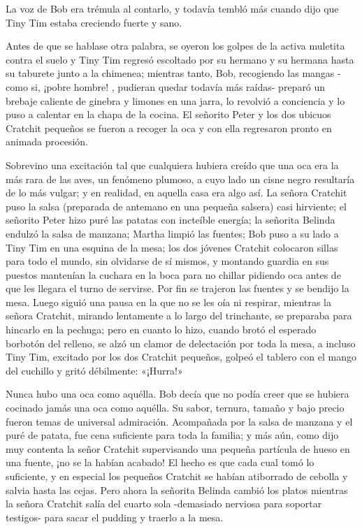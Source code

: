 \documentclass{novela}
\begin{document}
 La voz de Bob era trémula al contarlo, y todavía tembló más cuando dijo que Tiny Tim estaba creciendo fuerte y sano.

 Antes de que se hablase otra palabra, se oyeron los golpes de la activa muletita contra el suelo y Tiny Tim regresó escoltado por su hermano y su hermana hasta su taburete junto a la chimenea; mientras tanto, Bob, recogiendo las mangas -como si, ¡pobre hombre! , pudieran quedar todavía más raídas- preparó un brebaje caliente de ginebra y limones en una jarra, lo revolvió a conciencia y lo puso a calentar en la chapa de la cocina. El señorito Peter y los dos ubicuos Cratchit pequeños se fueron a recoger la oca y con ella regresaron pronto en animada procesión.

 Sobrevino una excitación tal que cualquiera hubiera creído que una oca era la más rara de las aves, un fenómeno plumoso, a cuyo lado un cisne negro resultaría de lo más vulgar; y en realidad, en aquella casa era algo así. La señora Cratchit puso la salsa (preparada de antemano en una pequeña salsera) casi hirviente; el señorito Peter hizo puré las patatas con incteíble energía; la señorita Belinda endulzó la salsa de manzana; Martha limpió las fuentes; Bob puso a su lado a Tiny Tim en una esquina de la mesa; los dos jóvenes Cratchit colocaron sillas para todo el mundo, sin olvidarse de sí mismos, y montando guardia en sus puestos mantenían la cuchara en la boca para no chillar pidiendo oca antes de que les llegara el turno de servirse. Por fin se trajeron las fuentes y se bendijo la mesa. Luego siguió una pausa en la que no se les oía ni respirar, mientras la señora Cratchit, mirando lentamente a lo largo del trinchante, se preparaba para hincarlo en la pechuga; pero en cuanto lo hizo, cuando brotó el esperado borbotón del relleno, se alzó un clamor de delectación por toda la mesa, a incluso Tiny Tim, excitado por los dos Cratchit pequeños, golpeó el tablero con el mango del cuchillo y gritó débilmente: «¡Hurra!»

 Nunca hubo una oca como aquélla. Bob decía que no podía creer que se hubiera cocinado jamás una oca como aquélla. Su sabor, ternura, tamaño y bajo precio fueron temas de universal admiración. Acompañada por la salsa de manzana y el puré de patata, fue cena suficiente para toda la familia; y más aún, como dijo muy contenta la señor Cratchit supervisando una pequeña partícula de hueso en una fuente, ¡no se la habían acabado! El hecho es que cada cual tomó lo suficiente, y en especial los pequeños Cratchit se habían atiborrado de cebolla y salvia hasta las cejas. Pero ahora la señorita Belinda cambió los platos mientras la señora Cratchit salía del cuarto sola -demasiado nerviosa para soportar testigos- para sacar el pudding y traerlo a la mesa.
\end{document}

